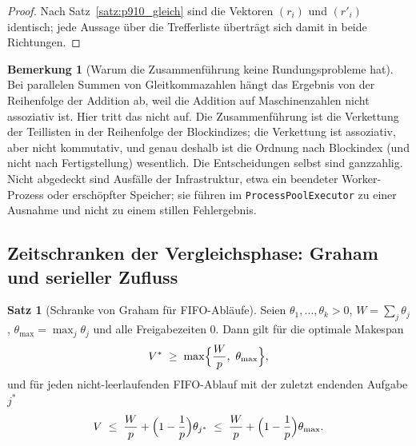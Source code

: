 \documentclass[a4paper,12pt, twoside]{report}
\theoremstyle{definition}
\newtheorem{satz}{Satz}
\newtheorem{bemerkung}{Bemerkung}
\begin{document}
\begin{proof}
Nach Satz~\ref{satz:p910_gleich} sind die Vektoren $(r_i)$ und $(r'_i)$ identisch; jede Aussage über die Trefferliste überträgt sich damit in beide Richtungen.
\end{proof}

\begin{bemerkung}[Warum die Zusammenführung keine Rundungsprobleme hat]
\label{bem:p910_reduktion}
Bei parallelen Summen von Gleitkommazahlen hängt das Ergebnis von der Reihenfolge der Addition ab, weil die Addition auf Maschinenzahlen nicht assoziativ ist. Hier tritt das nicht auf. Die Zusammenführung ist die Verkettung der Teillisten in der Reihenfolge der Blockindizes; die Verkettung ist assoziativ, aber nicht kommutativ, und genau deshalb ist die Ordnung nach Blockindex (und nicht nach Fertigstellung) wesentlich. Die Entscheidungen selbst sind ganzzahlig. Nicht abgedeckt sind Ausfälle der Infrastruktur, etwa ein beendeter Worker-Prozess oder erschöpfter Speicher; sie führen im \texttt{ProcessPoolExecutor} zu einer Ausnahme und nicht zu einem stillen Fehlergebnis.
\end{bemerkung}

\subsection{Zeitschranken der Vergleichsphase: Graham und serieller Zufluss}
\label{sec:p910_graham}

\begin{satz}[Schranke von Graham für FIFO-Abläufe]
\label{satz:p910_graham}
Seien $\theta_1,\dots,\theta_k>0$, $W=\sum_j\theta_j$, $\theta_{\max}=\max_j\theta_j$ und alle Freigabezeiten $0$. Dann gilt für die optimale Makespan
\[
V^\ast\;\ge\;\max\Bigl\{\frac Wp,\ \theta_{\max}\Bigr\},
\]
und für jeden nicht-leerlaufenden FIFO-Ablauf mit der zuletzt endenden Aufgabe $j^\ast$
\[
V\;\le\;\frac Wp+\Bigl(1-\frac1p\Bigr)\theta_{j^\ast}\;\le\;\frac Wp+\Bigl(1-\frac1p\Bigr)\theta_{\max}.
\]
\end{satz}
\end{document}
